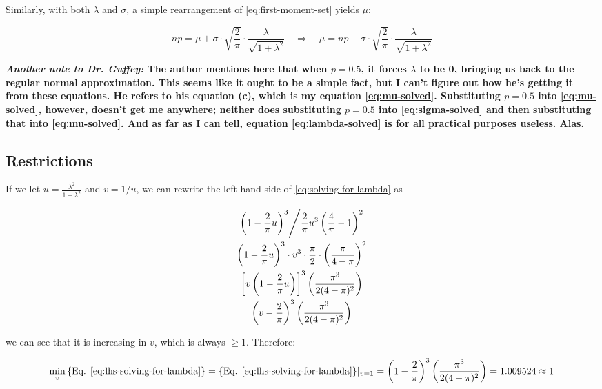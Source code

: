 \documentclass{article}
\begin{document}
Similarly, with both $\lambda$ and $\sigma$, a simple rearrangement of
\eqref{eq:first-moment-set} yields $\mu$:

\begin{equation}
  \label{eq:mu-solved}
  np = \mu + \sigma \cdot \sqrt{\frac{2}{\pi}} \cdot \frac{\lambda}{\sqrt{1 + \lambda^2}} \quad\Rightarrow\quad
  \mu = np - \sigma \cdot \sqrt{\frac{2}{\pi}} \cdot \frac{\lambda}{\sqrt{1 + \lambda^2}}
\end{equation}

\textbf{\textit{Another note to Dr. Guffey:} The author mentions here that when
$p=0.5$, it forces $\lambda$ to be 0, bringing us back to the regular normal
approximation. This seems like it ought to be a simple fact, but I can't figure
out how he's getting it from these equations. He refers to his equation (c),
which is my equation \eqref{eq:mu-solved}. Substituting $p=0.5$ into
\eqref{eq:mu-solved}, however, doesn't get me anywhere; neither does
substituting $p=0.5$ into \eqref{eq:sigma-solved} and then substituting that
into \eqref{eq:mu-solved}. And as far as I can tell, equation
\eqref{eq:lambda-solved} is for all practical purposes useless. Alas.}

\subsection{Restrictions}

If we let $u = \frac{\lambda^2}{1+\lambda^2}$ and $v = 1/u$, we can rewrite the
left hand side of \eqref{eq:solving-for-lambda} as

\begin{gather}
  \left. \left( 1 - \frac{2}{\pi} u \right)^3 \middle/ \frac{2}{\pi} u^3 \left( \frac{4}{\pi} - 1 \right)^2 \right. \nonumber \\
  \left( 1 - \frac{2}{\pi} u \right)^3 \cdot v^3 \cdot \frac{\pi}{2} \cdot \left( \frac{\pi}{4-\pi} \right)^2 \nonumber \\
  \left[ v \left( 1 - \frac{2}{\pi} u \right) \right]^3 \left( \frac{\pi^3}{2(4-\pi)^2} \right) \nonumber \\
  \left( v - \frac{2}{\pi} \right)^3 \left( \frac{\pi^3}{2(4-\pi)^2} \right) \label{eq:lhs-solving-for-lambda}
\end{gather}

we can see that it is increasing in $v$, which is always $\geq 1$. Therefore:

\begin{equation}
  \min_{v} \textnormal{\{Eq. \ref{eq:lhs-solving-for-lambda}\}} = \textnormal{\{Eq. \ref{eq:lhs-solving-for-lambda}\}} |_{v=1} = 
  \left( 1 - \frac{2}{\pi} \right)^3 \left( \frac{\pi^3}{2(4-\pi)^2} \right) = 1.009524 \approx 1
\end{equation}
\end{document}
